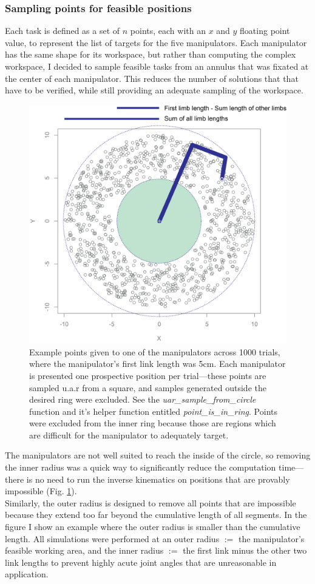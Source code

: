\documentclass[9pt,twocolumn,twoside]{pnas-new}
\begin{document}
\subsubsection*{Sampling points for feasible positions}
Each task is defined as a set of $n$ points, each with an $x$ and $y$ floating point value, to represent the list of targets for the five manipulators. Each manipulator has the same shape for its workspace, but rather than computing the complex workspace, I decided to sample feasible tasks from an annulus that was fixated at the center of each manipulator. This reduces the number of solutions that that have to be verified, while still providing an adequate sampling of the workspace.

\begin{figure}%
\centering
\includegraphics[width=.8\linewidth]{manipulator_subsample_points}
\caption{Example points given to one of the manipulators across 1000 trials, where the manipulator's first link length was 5cm. Each manipulator is presented one prospective position per trial---these points are sampled u.a.r from a square, and samples generated outside the desired ring were excluded. See the \textit{uar\_sample\_from\_circle} function and it's helper function entitled \textit{point\_is\_in\_ring}. Points were excluded from the inner ring because those are regions which are difficult for the manipulator to adequately target.}
\label{fig:points}
\end{figure}

The manipulators are not well suited to reach the inside of the circle, so removing the inner radius was a quick way to significantly reduce the computation time---there is no need to run the inverse kinematics on positions that are provably impossible (Fig. \ref{fig:points}). \\Similarly, the outer radius is designed to remove all points that are impossible because they extend too far beyond the cumulative length of all segments. In the figure I show an example where the outer radius is smaller than the cumulative length. All simulations were performed at an outer radius $:=$ the manipulator's feasible working area, and the inner radius $:=$ the first link minus the other two link lengths to prevent highly acute joint angles that are unreasonable in application.\\
\end{document}
